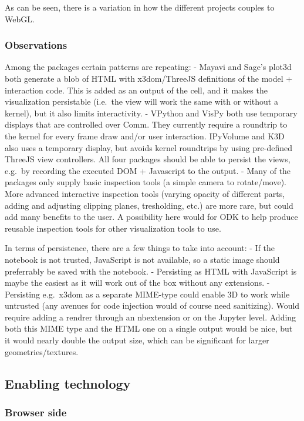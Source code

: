As can be seen, there is a variation in how the different projects
couples to WebGL.

\subsubsection{Observations}

Among the packages certain patterns are repeating: - Mayavi and Sage's
plot3d both generate a blob of HTML with x3dom/ThreeJS definitions of
the model + interaction code. This is added as an output of the cell,
and it makes the visualization persistable (i.e.~the view will work the
same with or without a kernel), but it also limits interactivity. -
VPython and VisPy both use temporary displays that are controlled over
Comm. They currently require a roundtrip to the kernel for every frame
draw and/or user interaction. IPyVolume and K3D also uses a temporary
display, but avoids kernel roundtrips by using pre-defined ThreeJS view
controllers. All four packages should be able to persist the views,
e.g.~by recording the executed DOM + Javascript to the output. - Many of
the packages only supply basic inspection tools (a simple camera to
rotate/move). More advanced interactive inspection tools (varying
opacity of different parts, adding and adjusting clipping planes,
tresholding, etc.) are more rare, but could add many benefits to the
user. A possibility here would for ODK to help produce reusable
inspection tools for other visualization tools to use.

In terms of persistence, there are a few things to take into account: -
If the notebook is not trusted, JavaScript is not available, so a static
image should preferrably be saved with the notebook. - Persisting as
HTML with JavaScript is maybe the easiest as it will work out of the box
without any extensions. - Persisting e.g.~x3dom as a separate MIME-type
could enable 3D to work while untrusted (any avenues for code injection
would of course need sanitizing). Would require adding a rendrer through
an nbextension or on the Jupyter level. Adding both this MIME type and
the HTML one on a single output would be nice, but it would nearly
double the output size, which can be significant for larger
geometries/textures.

\subsection{Enabling technology}

\subsubsection{Browser side}

